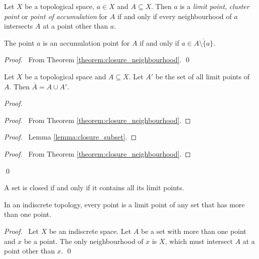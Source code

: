 \begin{definition}
    Let $X$ be a topological space, $a \in X$ and $A \subseteq X$. Then $a$ is a \emph{limit point},
    \emph{cluster point} or \emph{point of accumulation} for $A$ if and only if every neighbourhood of $a$
    intersects $A$ at a point other than $a$.
\end{definition}

\begin{lemma}
    The point $a$ is an accumulation point for $A$ if and only if $a \in \overline{A \setminus \{a\}}$.
\end{lemma}

\begin{proof}
    \pf\ From Theorem \ref{theorem:closure_neighbourhood}. \qed
\end{proof}

\begin{theorem}
    Let $X$ be a topological space and $A \subseteq X$. Let $A'$ be the set of all limit points of $A$.
    Then $\overline{A} = A \cup A'$.
\end{theorem}

\begin{proof}
    \pf
    \begin{proof}
        \pf\ From Theorem \ref{theorem:closure_neighbourhood}.
    \end{proof}
    \begin{proof}
        \pf\ Lemma \ref{lemma:closure_subset}.
    \end{proof}
    \begin{proof}
        \pf\ From Theorem \ref{theorem:closure_neighbourhood}.
    \end{proof}
    \qed
\end{proof}

\begin{corollary}
    A set is closed if and only if it contains all its limit points.
\end{corollary}

\begin{proposition}
    \label{proposition:indiscrete_limit_point}
    In an indiscrete topology, every point is a limit point of any set that has more than one point.
\end{proposition}

\begin{proof}
    \pf\ Let $X$ be an indiscrete space. Let $A$ be a set with more than one point and $x$ be a point.
    The only neighbourhood of $x$ is $X$, which must intersect $A$ at a point other than $x$. \qed
\end{proof}

